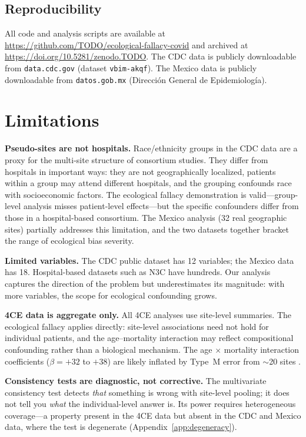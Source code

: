 \documentclass{article}
\begin{document}
\subsection{Reproducibility}

All code and analysis scripts are available at
\url{https://github.com/TODO/ecological-fallacy-covid} and archived at
\url{https://doi.org/10.5281/zenodo.TODO}.
The CDC data is publicly downloadable from \texttt{data.cdc.gov} (dataset
\texttt{vbim-akqf}).  The Mexico data is publicly downloadable from
\texttt{datos.gob.mx} (Direcci\'{o}n General de Epidemiolog\'{i}a).


\section{Limitations}

\textbf{Pseudo-sites are not hospitals.}  Race/ethnicity groups in the CDC
data are a proxy for the multi-site structure of consortium studies.  They
differ from hospitals in important ways: they are not geographically
localized, patients within a group may attend different hospitals, and the
grouping confounds race with socioeconomic factors.  The ecological fallacy
demonstration is valid---group-level analysis misses patient-level
effects---but the specific confounders differ from those in a hospital-based
consortium.  The Mexico analysis (32 real geographic sites) partially
addresses this limitation, and the two datasets together bracket the range
of ecological bias severity.

\textbf{Limited variables.}  The CDC public dataset has 12 variables; the
Mexico data has 18.  Hospital-based datasets such as N3C have hundreds.
Our analysis captures the direction of the problem but underestimates its
magnitude: with more variables, the scope for ecological confounding grows.

\textbf{4CE data is aggregate only.}  All 4CE analyses use site-level
summaries.  The ecological fallacy applies directly: site-level associations
need not hold for individual patients, and the age--mortality interaction may
reflect compositional confounding rather than a biological mechanism.  The
age $\times$ mortality interaction coefficients ($\beta = +32$ to $+38$) are
likely inflated by Type~M error from $\sim$20 sites
\cite{gelman2014typeMS}.

\textbf{Consistency tests are diagnostic, not corrective.}  The multivariate
consistency test detects \emph{that} something is wrong with site-level
pooling; it does not tell you \emph{what} the individual-level answer is.
Its power requires heterogeneous coverage---a property present in the 4CE
data but absent in the CDC and Mexico data, where the test is degenerate
(Appendix~\ref{app:degeneracy}).
\end{document}
